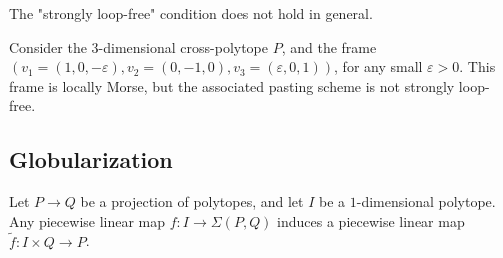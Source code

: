 
The "strongly loop-free" condition does not hold in general.

\begin{example}
	Consider the $3$-dimensional cross-polytope $P$, and the frame $(v_1=(1,0,-\varepsilon),v_2=(0,-1,0),v_3=(\varepsilon,0,1))$, for any small $\varepsilon >0$.
	This frame is locally Morse, but the associated pasting scheme is not strongly loop-free.
\end{example}

%

\subsection{Globularization}
\label{ss:globularization}


\begin{lemma}
	\label{l:adjunction-I}
	Let $P \to Q$ be a projection of polytopes, and let $I$ be a $1$-dimensional polytope.
	Any piecewise linear map $f \colon I \to \Sigma(P,Q)$ induces a piecewise linear map $\tilde f \colon I \times Q \to P$.
\end{lemma}

